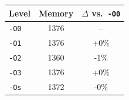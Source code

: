 \begin{tabular*}{\columnwidth}{@{\extracolsep\fill}lcc@{\extracolsep\fill}}
\toprule
\textbf{Level} & \textbf{Memory} & \textbf{$\Delta$ vs.\ \texttt{-O0}} \\
\midrule
\texttt{-O0} & 1376 & -- \\
\texttt{-O1} & 1376 & +0\% \\
\texttt{-O2} & 1360 & -1\% \\
\texttt{-O3} & 1376 & +0\% \\
\texttt{-Os} & 1372 & -0\% \\
\bottomrule
\end{tabular*}
